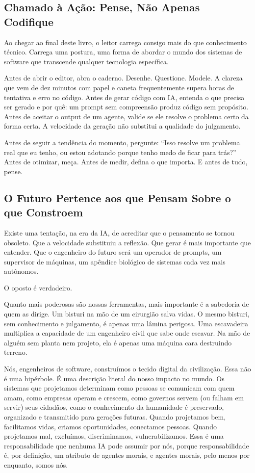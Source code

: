 \subsection{Chamado à Ação: Pense, Não Apenas Codifique}

Ao chegar ao final deste livro, o leitor carrega consigo mais do que conhecimento técnico. Carrega uma postura, uma forma de abordar o mundo dos sistemas de software que transcende qualquer tecnologia específica.

Antes de abrir o editor, abra o caderno. Desenhe. Questione. Modele. A clareza que vem de dez minutos com papel e caneta frequentemente supera horas de tentativa e erro no código. Antes de gerar código com IA, entenda o que precisa ser gerado e por quê: um prompt sem compreensão produz código sem propósito. Antes de aceitar o output de um agente, valide se ele resolve o problema certo da forma certa. A velocidade da geração não substitui a qualidade do julgamento.

Antes de seguir a tendência do momento, pergunte: ``Isso resolve um problema real que eu tenho, ou estou adotando porque tenho medo de ficar para trás?'' Antes de otimizar, meça. Antes de medir, defina o que importa. E antes de tudo, pense.

\subsection{O Futuro Pertence aos que Pensam Sobre o que Constroem}

\vspace{0.5cm}

Existe uma tentação, na era da IA, de acreditar que o pensamento se
tornou obsoleto. Que a velocidade substituiu a reflexão. Que gerar é
mais importante que entender. Que o engenheiro do futuro será um
operador de prompts, um supervisor de máquinas, um apêndice biológico
de sistemas cada vez mais autônomos.

O oposto é verdadeiro.

Quanto mais poderosas são nossas ferramentas, mais importante é a
sabedoria de quem as dirige. Um bisturi na mão de um cirurgião salva
vidas. O mesmo bisturi, sem conhecimento e julgamento, é apenas uma
lâmina perigosa. Uma escavadeira multiplica a capacidade de um
engenheiro civil que sabe onde escavar. Na mão de alguém sem planta
nem projeto, ela é apenas uma máquina cara destruindo terreno.

Nós, engenheiros de software, construímos o tecido digital da
civilização. Essa não é uma hipérbole. É uma descrição literal do
nosso impacto no mundo. Os sistemas que projetamos determinam como
pessoas se comunicam com quem amam, como empresas operam e crescem,
como governos servem (ou falham em servir) seus cidadãos, como
o conhecimento da humanidade é preservado, organizado e transmitido
para gerações futuras. Quando projetamos bem, facilitamos vidas,
criamos oportunidades, conectamos pessoas. Quando projetamos mal,
excluímos, discriminamos, vulnerabilizamos. Essa é uma responsabilidade
que nenhuma IA pode assumir por nós, porque responsabilidade é, por
definição, um atributo de agentes morais, e agentes morais, pelo
menos por enquanto, somos nós.

